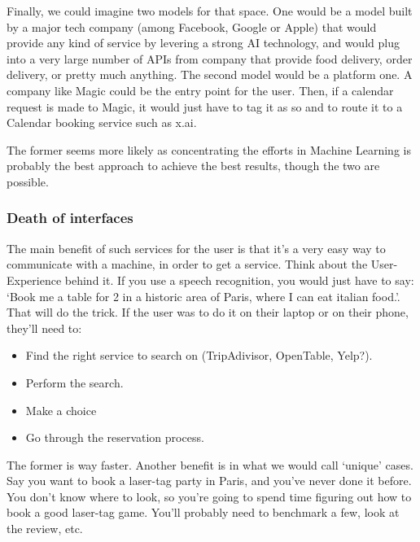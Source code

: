 \documentclass[12pt]{article}
\begin{document}
Finally, we could imagine two models for that space.
One would be a model built by a major tech company (among Facebook, Google or
Apple) that would provide any kind of service by levering a strong AI
technology, and would plug into a very large number of APIs from company that
provide food delivery, order delivery, or pretty much anything.
The second model would be a platform one. A company like Magic could be the
entry point for the user. Then, if a calendar request is made to Magic, it would
just have to tag it as so and to route it to a Calendar booking service such as
x.ai.

The former seems more likely as concentrating the efforts in Machine Learning is
probably the best approach to achieve the best results, though the two are
possible.

\subsubsection{Death of interfaces}

The main benefit of such services for the user is that it's a very easy way to
communicate with a machine, in order to get a service. Think about the
User-Experience behind it. If you use a speech recognition, you would just
have to say: \lq Book me a table for 2 in a historic area of Paris, where I
can eat italian
food.\rq. That will do the trick.
If the user was to do it on their laptop or on their phone, they'll need to:
\begin{itemize}
  \item Find the right service to search on (TripAdivisor, OpenTable, Yelp?).
  \item Perform the search.
  \item Make a choice
  \item Go through the reservation process.
\end{itemize}

The former is way faster. Another benefit is in what we would call \lq unique\rq
cases. Say you want to book a laser-tag party in Paris, and you've never done it
before. You don't know where to look, so you're going to spend time figuring out
how to book a good laser-tag game. You'll probably need to benchmark a few,
look at the review, etc.
\end{document}
